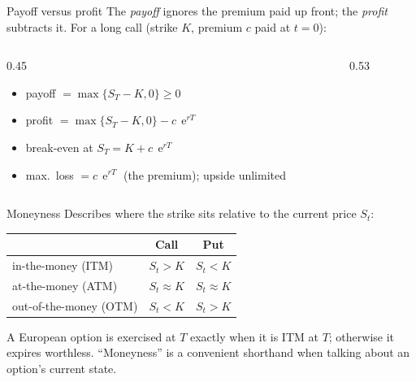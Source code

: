 \documentclass[pdf, handout]{beamer}
\newcommand{\e}{\operatorname{e}}
\begin{document}
\begin{frame}{Payoff versus profit}
The \emph{payoff} ignores the premium paid up front; the \emph{profit} subtracts it. For a long call (strike $K$, premium $c$ paid at $t=0$):
\begin{columns}[c]
\begin{column}{0.45\textwidth}
\footnotesize
\begin{itemize}
\item payoff $=\max\{S_T-K,0\}\geq 0$
\item profit $=\max\{S_T-K,0\}-c\,\e^{rT}$
\item break-even at $S_T=K+c\,\e^{rT}$
\item max.\ loss $=c\,\e^{rT}$ (the premium); upside unlimited
\end{itemize}
\end{column}
\begin{column}{0.53\textwidth}
\centering
{}
\end{column}
\end{columns}
\end{frame}

\begin{frame}{Moneyness}
Describes where the strike sits relative to the current price $S_t$:
\medskip
\begin{center}
\renewcommand{\arraystretch}{1.3}
\begin{tabular}{lcc}
\hline
 & \textbf{Call} & \textbf{Put} \\
\hline
in-the-money (ITM) & $S_t>K$ & $S_t<K$ \\
at-the-money (ATM) & $S_t\approx K$ & $S_t\approx K$ \\
out-of-the-money (OTM) & $S_t<K$ & $S_t>K$ \\
\hline
\end{tabular}
\end{center}
\medskip
A European option is exercised at $T$ exactly when it is ITM at $T$; otherwise it expires worthless. ``Moneyness'' is a convenient shorthand when talking about an option's current state.
\end{frame}
\end{document}
